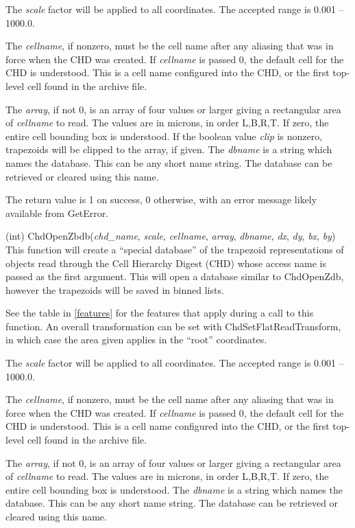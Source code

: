 \begin{description}
The {\it scale} factor will be applied to all coordinates.  The
accepted range is 0.001 -- 1000.0.

The {\it cellname}, if nonzero, must be the cell name after any
aliasing that was in force when the CHD was created.  If {\it
cellname} is passed 0, the default cell for the CHD is understood. 
This is a cell name configured into the CHD, or the first top-level
cell found in the archive file.

The {\it array}, if not 0, is an array of four values or larger giving
a rectangular area of {\it cellname} to read.  The values are in
microns, in order L,B,R,T.  If zero, the entire cell bounding box is
understood.  If the boolean value {\it clip} is nonzero, trapezoids
will be clipped to the array, if given.  The {\it dbname} is a string
which names the database.  This can be any short name string.  The
database can be retrieved or cleared using this name.

The return value is 1 on success, 0 otherwise, with an error message
likely available from {\vt GetError}.

\item{(int) \vt ChdOpenZbdb({\it chd\_name\/}, {\it scale\/}, {\it cellname\/},
  {\it array\/}, {\it dbname}, {\it dx\/}, {\it dy\/},
  {\it bx\/}, {\it by\/})}\\
This function will create a ``special database'' of the trapezoid
representations of objects read through the Cell Hierarchy Digest
(CHD) whose access name is passed as the first argument.  This will
open a database similar to {\vt ChdOpenZdb}, however the trapezoids
will be saved in binned lists. 

See the table in \ref{features} for the features that apply during a
call to this function.  An overall transformation can be set with {\vt
ChdSetFlatReadTransform}, in which case the area given applies in the
``root'' coordinates.

The {\it scale} factor will be applied to all coordinates.  The
accepted range is 0.001 -- 1000.0.

The {\it cellname}, if nonzero, must be the cell name after any
aliasing that was in force when the CHD was created.  If {\it
cellname} is passed 0, the default cell for the CHD is understood. 
This is a cell name configured into the CHD, or the first top-level
cell found in the archive file.

The {\it array}, if not 0, is an array of four values or larger giving
a rectangular area of {\it cellname} to read.  The values are in
microns, in order L,B,R,T.  If zero, the entire cell bounding box is
understood.  The {\it dbname} is a string which names the database. 
This can be any short name string.  The database can be retrieved or
cleared using this name.


\end{description}
